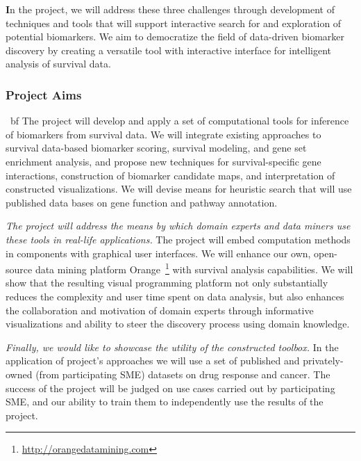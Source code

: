\documentclass[11pt,a4paper]{article}
\renewcommand{\bf}{\textbf}
\begin{document}
{\bf In the project, we will address these three challenges through development of techniques and tools that will support interactive search for and exploration of potential biomarkers.} We aim to democratize the field of data-driven biomarker discovery by creating a versatile tool with interactive interface for intelligent analysis of survival data.

\subsubsection*{Project Aims}

{\ bf The project will develop and apply a set of computational tools for inference of biomarkers from survival data.} We will integrate existing approaches to survival data-based biomarker scoring, survival modeling, and gene set enrichment analysis, and propose new techniques for survival-specific gene interactions, construction of biomarker candidate maps, and interpretation of constructed visualizations. We will devise means for heuristic search that will use published data bases on gene function and pathway annotation.

{\em The project will address the means by which domain experts and data miners use these tools in real-life applications.} The project will embed computation methods in components with graphical user interfaces. We will enhance our own, open-source data mining platform Orange~\footnote{\url{http://orangedatamining.com}} with survival analysis capabilities. We will show that the resulting visual programming platform not only substantially reduces the complexity and user time spent on data analysis, but also enhances the collaboration and motivation of domain experts through informative visualizations and ability to steer the discovery process using domain knowledge. 

{\em Finally, we would like to showcase the utility of the constructed toolbox.} In the application of project's approaches we will use a set of published and privately-owned (from participating SME) datasets on drug response and cancer. The success of the project will be judged on use cases carried out by participating SME, and our ability to train them to independently use the results of the project.
\end{document}

